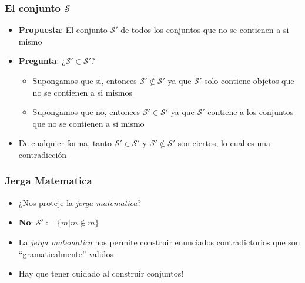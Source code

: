 \documentclass{beamer}
\begin{document}
\begin{frame}
    \frametitle{El conjunto $\mathcal{S}$}
    \begin{itemize}
        \item{{\bf Propuesta}: El conjunto $\mathcal{S'}$ de todos los
        conjuntos que no se contienen a si mismo}
        \item{{\bf Pregunta}: ¿$\mathcal{S'}\in\mathcal{S'}$?
        \begin{itemize}
            \item{Supongamos que si, entonces $\mathcal{S'}\not\in\mathcal{S'}$
            ya que $\mathcal{S'}$ solo contiene objetos que no se contienen a si mismos}
            \item{Supongamos que no, entonces $\mathcal{S'}\in\mathcal{S'}$ ya que
            $\mathcal{S'}$ contiene a los conjuntos que no se contienen a si mismo}
        \end{itemize}
        }
        \item{De cualquier forma, tanto $\mathcal{S'}\in\mathcal{S'}$
        y $\mathcal{S'}\not\in\mathcal{S'}$ son ciertos, lo cual es una
        contradicci\'on}
    \end{itemize}
\end{frame}

\begin{frame}
    \frametitle{Jerga Matematica}
    \begin{itemize}
        \item{¿Nos proteje la \emph{jerga matematica}?}
        \item{{\bf No}: $\mathcal{S'}:=\{m|m\not\in m\}$}
        \item{La \emph{jerga matematica} nos permite construir
        enunciados contradictorios que son ``gramaticalmente''
        validos}
        \item{Hay que tener cuidado al construir conjuntos!}
    \end{itemize}
\end{frame}
\end{document}
